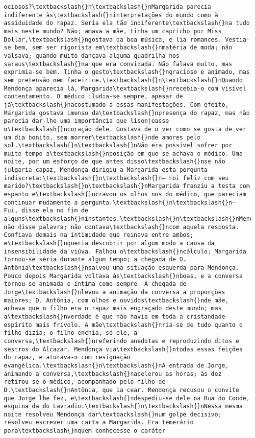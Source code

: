 \documentclass[11pt]{article}
\begin{document}
\begin{Verbatim}[commandchars=\\\{\}]
ociosos?\textbackslash{}n\textbackslash{}nMargarida parecia indiferente às\textbackslash{}ninterpretações do mundo como à assiduidade do rapaz. Seria ela tão indiferente\textbackslash{}na tudo mais neste mundo? Não; amava a mãe, tinha um capricho por Miss Dollar,\textbackslash{}ngostava da boa música, e lia romances. Vestia-se bem, sem ser rigorista em\textbackslash{}nmatéria de moda; não valsava; quando muito dançava alguma quadrilha nos saraus\textbackslash{}na que era convidada. Não falava muito, mas exprimia-se bem. Tinha o gesto\textbackslash{}ngracioso e animado, mas sem pretensão nem faceirice.\textbackslash{}n\textbackslash{}nQuando Mendonça aparecia lá, Margarida\textbackslash{}nrecebia-o com visível contentamento. O médico iludia-se sempre, apesar de já\textbackslash{}nacostumado a essas manifestações. Com efeito, Margarida gostava imenso da\textbackslash{}npresença do rapaz, mas não parecia dar-lhe uma importância que lisonjeasse o\textbackslash{}ncoração dele. Gostava de o ver como se gosta de ver um dia bonito, sem morrer\textbackslash{}nde amores pelo sol.\textbackslash{}n\textbackslash{}nNão era possível sofrer por muito tempo a\textbackslash{}nposição em que se achava o médico. Uma noite, por um esforço de que antes disso\textbackslash{}nse não julgaria capaz, Mendonça dirigiu a Margarida esta pergunta indiscreta:\textbackslash{}n\textbackslash{}n— Foi feliz com seu marido?\textbackslash{}n\textbackslash{}nMargarida franziu a testa com espanto e\textbackslash{}ncravou os olhos nos do médico, que pareciam continuar mudamente a pergunta.\textbackslash{}n\textbackslash{}n— Fui, disse ela no fim de alguns\textbackslash{}ninstantes.\textbackslash{}n\textbackslash{}nMendonça não disse palavra; não contava\textbackslash{}ncom aquela resposta. Confiava demais na intimidade que reinava entre ambos; e\textbackslash{}nqueria descobrir por algum modo a causa da insensibilidade da viúva. Falhou o\textbackslash{}ncálculo; Margarida tornou-se séria durante algum tempo; a chegada de D. Antônia\textbackslash{}nsalvou uma situação esquerda para Mendonça. Pouco depois Margarida voltava às\textbackslash{}nboas, e a conversa tornou-se animada e íntima como sempre. A chegada de Jorge\textbackslash{}nlevou a animação da conversa a proporções maiores; D. Antônia, com olhos e ouvidos\textbackslash{}nde mãe, achava que o filho era o rapaz mais engraçado deste mundo; mas a\textbackslash{}nverdade é que não havia em toda a cristandade espírito mais frívolo. A mãe\textbackslash{}nria-se de tudo quanto o filho dizia; o filho enchia, só ele, a conversa,\textbackslash{}nreferindo anedotas e reproduzindo ditos e sestros do Alcazar. Mendonça via\textbackslash{}ntodas essas feições do rapaz, e aturava-o com resignação evangélica.\textbackslash{}n\textbackslash{}nA entrada de Jorge, animando a conversa,\textbackslash{}nacelerou as horas; às dez retirou-se o médico, acompanhado pelo filho de D.\textbackslash{}nAntônia, que ia cear. Mendonça recusou o convite que Jorge lhe fez, e\textbackslash{}ndespediu-se dele na Rua do Conde, esquina da do Lavradio.\textbackslash{}n\textbackslash{}nNessa mesma noite resolveu Mendonça dar\textbackslash{}num golpe decisivo; resolveu escrever uma carta a Margarida. Era temerário para\textbackslash{}nquem conhecesse o caráter 
\end{Verbatim}
\end{document}
